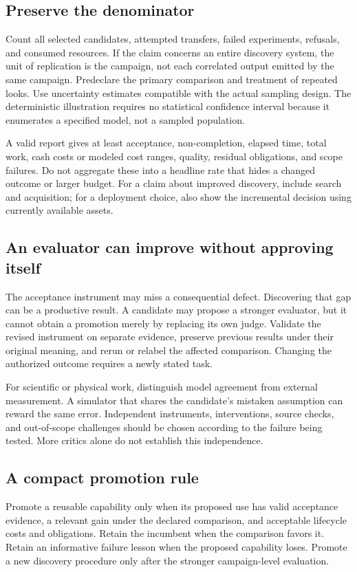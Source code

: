 \documentclass[11pt,letterpaper]{article}
\theoremstyle{remark}\newtheorem{remark}{Remark}[section]
\begin{document}
\subsection{Preserve the denominator}
Count all selected candidates, attempted transfers, failed experiments, refusals, and consumed resources.
If the claim concerns an entire discovery system, the unit of replication is the campaign, not each correlated output emitted by the same campaign.
Predeclare the primary comparison and treatment of repeated looks.
Use uncertainty estimates compatible with the actual sampling design.
The deterministic illustration requires no statistical confidence interval because it enumerates a specified model, not a sampled population.

A valid report gives at least acceptance, non-completion, elapsed time, total work, cash costs or modeled cost ranges, quality, residual obligations, and scope failures.
Do not aggregate these into a headline rate that hides a changed outcome or larger budget.
For a claim about improved discovery, include search and acquisition; for a deployment choice, also show the incremental decision using currently available assets.

\subsection{An evaluator can improve without approving itself}
The acceptance instrument may miss a consequential defect.
Discovering that gap can be a productive result.
A candidate may propose a stronger evaluator, but it cannot obtain a promotion merely by replacing its own judge.
Validate the revised instrument on separate evidence, preserve previous results under their original meaning, and rerun or relabel the affected comparison.
Changing the authorized outcome requires a newly stated task.

For scientific or physical work, distinguish model agreement from external measurement.
A simulator that shares the candidate's mistaken assumption can reward the same error.
Independent instruments, interventions, source checks, and out-of-scope challenges should be chosen according to the failure being tested.
More critics alone do not establish this independence.

\subsection{A compact promotion rule}
Promote a reusable capability only when its proposed use has valid acceptance evidence, a relevant gain under the declared comparison, and acceptable lifecycle costs and obligations.
Retain the incumbent when the comparison favors it.
Retain an informative failure lesson when the proposed capability loses.
Promote a new discovery procedure only after the stronger campaign-level evaluation.
\end{document}
